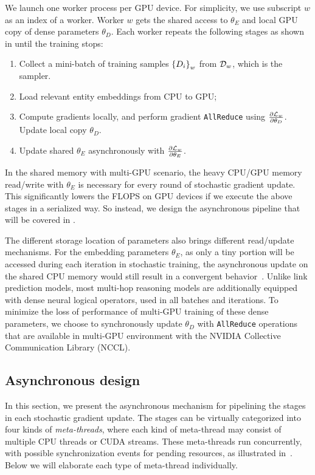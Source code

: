 We launch one worker process per GPU device. For simplicity, we use subscript $w$ as an index of a worker. Worker $w$ gets the shared access to $\theta_E$ and local GPU copy of dense parameters $\theta_D$. Each worker repeats the following stages as shown in  until the training stops:
\begin{enumerate}[noitemsep,topsep=0pt,parsep=1pt,partopsep=0pt, leftmargin=*]
	\item Collect a mini-batch of training samples $\left\{D_i\right\}_w$ from $\mathcal{D}_w$, which is the sampler.
	\item Load relevant entity embeddings from CPU to GPU;
	\item Compute gradients locally, and perform gradient \texttt{AllReduce} using $\frac{\partial \mathcal{L}_w}{\partial \theta_D}$. Update local copy $\theta_D$.
	\item Update shared $\theta_E$ asynchronously with $\frac{\partial \mathcal{L}_w}{\partial \theta_E}$. 
\end{enumerate}
% 
In the shared memory with multi-GPU scenario, the heavy CPU/GPU memory read/write with $\theta_E$ is necessary for every round of stochastic gradient update. This significantly lowers the FLOPS on GPU devices if we execute the above stages in a serialized way. So instead, we design the asynchronous pipeline that will be covered in .


The different storage location of parameters also brings different read/update mechanisms. For the embedding parameters $\theta_E$, as only a tiny portion will be accessed during each iteration in stochastic training, the asynchronous update on the shared CPU memory would still result in a convergent behavior~\citep{niu2011hogwild}. Unlike link prediction models, most multi-hop reasoning models are additionally equipped with dense neural logical operators, used in all batches and iterations.
To minimize the loss of performance of multi-GPU training of these dense parameters, we choose to synchronously update $\theta_D$ with \texttt{AllReduce} operations that are available in multi-GPU environment with the NVIDIA Collective Communication Library (NCCL).



\subsection{Asynchronous design}
\label{sec:async_design}


In this section, we present the asynchronous mechanism for pipelining the stages in each stochastic gradient update. The stages can be virtually categorized into four kinds of \textit{meta-threads}, where each kind of meta-thread may consist of multiple CPU threads or CUDA streams. These meta-threads run concurrently, with possible synchronization events for pending resources, as illustrated in~.
% 
Below we will elaborate each type of meta-thread individually. 




